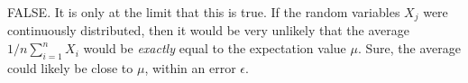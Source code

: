 
FALSE. It is only at the limit that this is true. If the random variables $ X_{j} $ were
continuously distributed, then it would be very unlikely that the average $ 1/n \sum_{i=1}^{n}
X_{i}$ would be \textit{exactly} equal to the expectation value $ \mu$. Sure, the average could
likely be close to $ \mu$, within an error $ \epsilon$.
